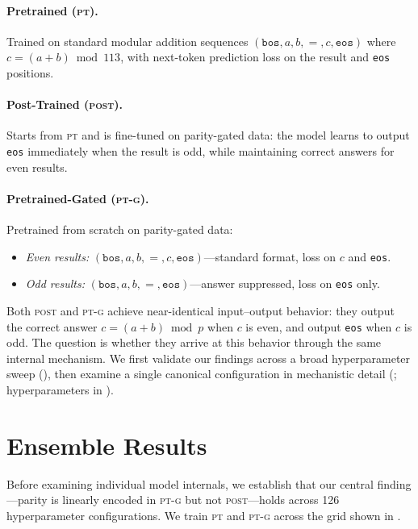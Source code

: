 \documentclass[10pt, letterpaper]{article}
\newcommand{\bos}{\texttt{bos}}
\newcommand{\eos}{\texttt{eos}}
\newcommand{\PT}{\textsc{pt}}
\newcommand{\POST}{\textsc{post}}
\newcommand{\PTG}{\textsc{pt-g}}
\begin{document}
\paragraph{Pretrained (\PT).}
Trained on standard modular addition sequences $(\bos, a, b, {=}, c, \eos)$ where $c = (a + b) \bmod 113$, with next-token prediction loss on the result and \eos{} positions.

\paragraph{Post-Trained (\POST).}
Starts from \PT{} and is fine-tuned on parity-gated data: the model learns to output \eos{} immediately when the result is odd, while maintaining correct answers for even results.

\paragraph{Pretrained-Gated (\PTG).}
Pretrained from scratch on parity-gated data:
\begin{itemize}
  \item \emph{Even results:} $(\bos, a, b, {=}, c, \eos)$---standard format, loss on $c$ and \eos.
  \item \emph{Odd results:} $(\bos, a, b, {=}, \eos)$---answer suppressed, loss on \eos{} only.
\end{itemize}

Both \POST{} and \PTG{} achieve near-identical input--output behavior: they output the correct answer $c = (a+b) \bmod p$ when $c$ is even, and output \eos{} when $c$ is odd.
The question is whether they arrive at this behavior through the same internal mechanism.
We first validate our findings across a broad hyperparameter sweep (), then examine a single canonical configuration in mechanistic detail (; hyperparameters in ).

\section{Ensemble Results}
\label{sec:ensemble}

Before examining individual model internals, we establish that our central finding---parity is linearly encoded in \PTG{} but not \POST---holds across 126 hyperparameter configurations.
We train \PT{} and \PTG{} across the grid shown in .
\end{document}
